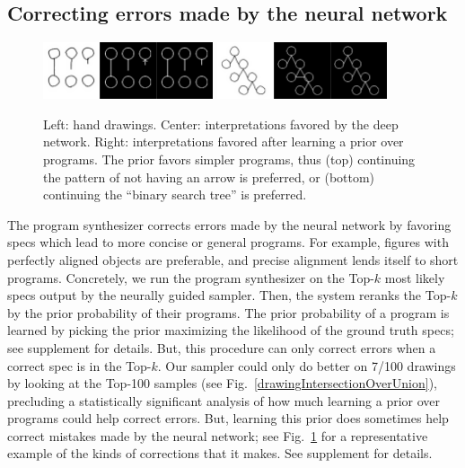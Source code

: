 \documentclass{article}
\theoremstyle{definition}
\begin{document}
\begin{table}[h]
\pagebreak\subsection{Correcting errors made by the neural network}\label{synthesizerHelpsParsing}
\begin{figure}\vspace{-0.5cm}
  \includegraphics[width = 5cm]{figures/programSuccess7.png}
  \includegraphics[width = 5cm]{figures/programSuccess16.png}
  \caption{Left: hand drawings. Center: interpretations favored by the deep network. Right: interpretations favored after learning a prior over programs. The prior favors  simpler programs, thus (top) continuing the pattern of not having an arrow is preferred, or (bottom) continuing the ``binary search tree'' is preferred.}\label{exampleOfProgramCorrectingMistake}
\vspace{-0.75cm}  \end{figure}
The program synthesizer corrects errors made by the neural network by favoring specs which lead to more
concise or general programs.  For example, figures with perfectly aligned objects are preferable, %
and precise alignment lends itself to short
programs.
Concretely,
we run the program synthesizer on the
Top-$k$  most likely specs output by the neurally guided sampler.
Then, the system
reranks the Top-$k$  by  the prior probability of their programs.
The prior probability of a program is learned by picking the prior maximizing
the likelihood of the ground truth specs;
see supplement for details.
But, this procedure can only correct errors when
a correct spec is in the Top-$k$.
Our sampler could only do better on
7/100 drawings by looking at the Top-100 samples
(see Fig.~\ref{drawingIntersectionOverUnion}),
precluding a statistically significant analysis of how much
learning a prior over programs could help correct errors.
But,
learning this prior does sometimes 
help correct mistakes made by the neural network; %
see
Fig.~\ref{exampleOfProgramCorrectingMistake} for a representative
example of the kinds of corrections that it makes.
See supplement for details.




\end{table}
\end{document}
